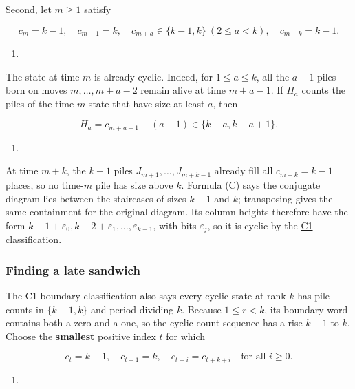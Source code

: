 \documentclass[11pt,a4paper]{article}
\providecommand{\tightlist}{\setlength{\itemsep}{0pt}\setlength{\parskip}{0pt}}
\begin{document}
Second, let \(m\ge1\) satisfy

\[
c_m=k-1,\quad c_{m+1}=k,\quad
c_{m+a}\in\{k-1,k\}\ (2\le a<k),\quad c_{m+k}=k-1.
\]

\begin{enumerate}
\def\labelenumi{(\Alph{enumi})}
\setcounter{enumi}{1}
\tightlist
\item
\end{enumerate}

The state at time \(m\) is already cyclic. Indeed, for \(1\le a\le k\), all the \(a-1\) piles born on moves \(m,\ldots,m+a-2\) remain alive at time \(m+a-1\). If \(H_a\) counts the piles of the time-\(m\) state that have size at least \(a\), then

\[
H_a=c_{m+a-1}-(a-1)\in\{k-a,k-a+1\}.
\]

\begin{enumerate}
\def\labelenumi{(\Alph{enumi})}
\setcounter{enumi}{2}
\tightlist
\item
\end{enumerate}

At time \(m+k\), the \(k-1\) piles \(J_{m+1},\ldots,J_{m+k-1}\) already fill all \(c_{m+k}=k-1\) places, so no time-\(m\) pile has size above \(k\). Formula (C) says the conjugate diagram lies between the staircases of sizes \(k-1\) and \(k\); transposing gives the same containment for the original diagram. Its column heights therefore have the form \(k-1+\varepsilon_0,k-2+\varepsilon_1,\ldots,\varepsilon_{k-1}\), with bits \(\varepsilon_j\), so it is cyclic by the \href{https://github.com/mpelteshki/climbing-to-the-frontier/blob/212bba53b1818c08c40b8c4b48f636651eaf6410/cagent/p3/c1/written-proof.md}{C1 classification}.

\subsubsection{Finding a late sandwich}\label{finding-a-late-sandwich}

The C1 boundary classification also says every cyclic state at rank \(k\) has pile counts in \(\{k-1,k\}\) and period dividing \(k\). Because \(1\le r<k\), its boundary word contains both a zero and a one, so the cyclic count sequence has a rise \(k-1\) to \(k\). Choose the \textbf{smallest} positive index \(t\) for which

\[
c_t=k-1,\quad c_{t+1}=k,\quad
c_{t+i}=c_{t+k+i}\quad\text{for all }i\ge0.
\]

\begin{enumerate}
\def\labelenumi{(\Alph{enumi})}
\setcounter{enumi}{3}
\tightlist
\item
\end{enumerate}
\end{document}
